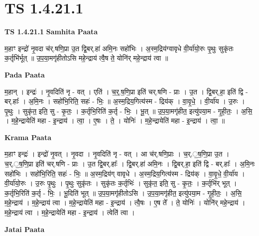 \documentclass[17pt]{extarticle}
\begin{document}
\section*{ TS 1.4.21.1 }

\textbf{TS 1.4.21.1 } \newline
\textbf{Samhita Paata} \newline

म॒हाꣳ इन्द्रो॑ नृ॒वदा च॑र्.षणि॒प्रा उ॒त द्वि॒बर्.हा॑ अमि॒नः सहो॑भिः । अ॒स्म॒द्रिय॑ग्वावृधे वी॒र्या॑यो॒रुः पृ॒थुः सुकृ॑तः क॒र्तृभि॑र्भूत् ॥ उ॒प॒या॒मगृ॑हीतोऽसि महे॒न्द्राय॑ त्वै॒ष ते॒ योनि॑र् महे॒न्द्राय॑ त्वा ॥ \newline

\textbf{Pada Paata} \newline

म॒हान् । इन्द्रः॑ । नृ॒वदिति॑ नृ - वत् । एति॑ । च॒र्॒.ष॒णि॒प्रा इति॑ चर्.षणि - प्राः । उ॒त । द्वि॒बर्.हा॒ इति॑ द्वि - बर्.हाः᳚ । अ॒मि॒नः । सहो॑भि॒रिति॒ सहः॑ - भिः॒ ॥ अ॒स्म॒द्रिय॒गित्य॑स्म - द्रिय॑क् । वा॒वृ॒धे॒ । वी॒र्या॑य । उ॒रुः । पृ॒थुः । सुकृ॑त॒ इति॒ सु - कृ॒तः॒ । क॒र्तृभि॒रिति॑ क॒र्तृ - भिः॒ । भू॒त् ॥ उ॒प॒या॒मगृ॑हीत॒ इत्यु॑पया॒म - गृ॒ही॒तः॒ । अ॒सि॒ । म॒हे॒न्द्रायेति॑ महा - इ॒न्द्राय॑ । त्वा॒ । ए॒षः । ते॒ । योनिः॑ । म॒हे॒न्द्रायेति॑ महा - इ॒न्द्राय॑ । त्वा॒ ॥  \newline


\textbf{Krama Paata} \newline

म॒हाꣳ इन्द्रः॑ । इन्द्रो॑ नृ॒वत् । नृ॒वदा । नृ॒वदिति॑ नृ - वत् । आ च॑र्.षणि॒प्राः । च॒र्.॒ष॒णि॒प्रा उ॒त । च॒र्.॒ष॒णि॒प्रा इति॑ चर्.षणि - प्राः । उ॒त द्वि॒बर्.हाः᳚ । द्वि॒बर्.हा॑ अमि॒नः । द्वि॒बर्.हा॒ इति॑ द्वि - बर्.हाः᳚ । अ॒मि॒नः सहो॑भिः । सहो॑भि॒रिति॒ सहः॑ - भिः॒ ॥ अ॒स्म॒द्रिय॑ग् वावृधे । अ॒स्म॒द्रिय॒गित्य॑स्म - द्रिय॑क् । वा॒वृ॒धे॒ वी॒र्या॑य । वी॒र्या॑यो॒रुः । उ॒रुः पृ॒थुः । पृ॒थुः सुकृ॑तः । सुकृ॑तः क॒र्तृभिः॑ । सुकृ॑त॒ इति॒ सु - कृ॒तः॒ । क॒र्तृभि॑र् भूत् । क॒र्तृभि॒रिति॑ क॒र्तृ - भिः॒ । भू॒दिति॑ भूत् ॥ उ॒प॒या॒मगृ॑हीतोऽसि । उ॒प॒या॒मगृ॑हीत॒ इत्यु॑पया॒म - गृ॒ही॒तः॒ । अ॒सि॒ म॒हे॒न्द्राय॑ । म॒हे॒न्द्राय॑ त्वा । म॒हे॒न्द्रायेति॑ महा - इ॒न्द्राय॑ । त्वै॒षः । ए॒ष ते᳚ । ते॒ योनिः॑ । योनि॑र् महे॒न्द्राय॑ । म॒हे॒न्द्राय॑ त्वा । म॒हे॒न्द्रायेति॑ महा - इ॒न्द्राय॑ । त्वेति॑ त्वा । \newline

\textbf{Jatai Paata} \newline
\end{document}
